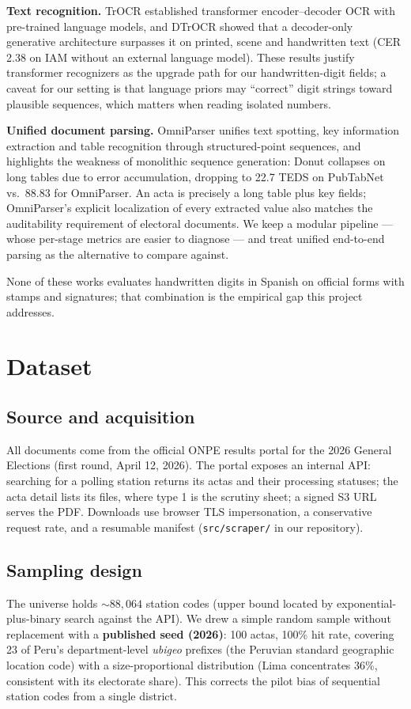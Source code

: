\documentclass[conference]{IEEEtran}
\begin{document}
\textbf{Text recognition.} TrOCR \cite{trocr} established transformer
encoder--decoder OCR with pre-trained language models, and DTrOCR
\cite{dtrocr} showed that a decoder-only generative architecture surpasses it
on printed, scene and handwritten text (CER 2.38 on IAM without an external
language model). These results justify transformer recognizers as the upgrade
path for our handwritten-digit fields; a caveat for our setting is that
language priors may ``correct'' digit strings toward plausible sequences,
which matters when reading isolated numbers.

\textbf{Unified document parsing.} OmniParser \cite{omniparser} unifies text
spotting, key information extraction and table recognition through
structured-point sequences, and highlights the weakness of monolithic
sequence generation: Donut \cite{donut} collapses on long tables due to
error accumulation, dropping to 22.7 TEDS on PubTabNet vs.\ 88.83 for
OmniParser. An acta is precisely a long table plus key
fields; OmniParser's explicit localization of every extracted value also
matches the auditability requirement of electoral documents. We keep a
modular pipeline --- whose per-stage metrics are easier to diagnose --- and
treat unified end-to-end parsing as the alternative to compare against.

None of these works evaluates handwritten digits in Spanish on official forms
with stamps and signatures; that combination is the empirical gap this
project addresses.

\section{Dataset}
\subsection{Source and acquisition}
All documents come from the official ONPE results portal for the 2026
General Elections (first round, April 12, 2026). The portal exposes an
internal API: searching for a polling station returns its actas and their processing statuses;
the acta detail lists its files, where type 1 is the scrutiny sheet; a
signed S3 URL serves the PDF. Downloads use browser TLS impersonation, a
conservative request rate, and a resumable manifest
(\texttt{src/scraper/} in our repository).

\subsection{Sampling design}
The universe holds ${\sim}88{,}064$ station codes (upper bound located by
exponential-plus-binary search against the API). We drew a simple random
sample without replacement with a \textbf{published seed (2026)}: 100 actas,
100\% hit rate, covering 23 of Peru's department-level \emph{ubigeo} prefixes (the Peruvian standard geographic location code) with a
size-proportional distribution (Lima concentrates 36\%, consistent with its
electorate share). This corrects the pilot bias of sequential station codes
from a single district.
\end{document}
